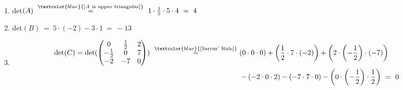 {\color{solution}
\begin{enumerate}
	\item det$(A)~\stackrel{\textcolor{blue}{[A~\text{is upper triangular}]}}{=}~1\cdot\frac{1}{5}\cdot5\cdot4~=~4$
	\item 
	det$(B)~=~5\cdot(-2)-3\cdot1~=~-13$
	\item 
	\begin{align*}
	\text{det}(C)=\text{det}(\begin{pmatrix}
	0&\frac{1}{2}&2\\
	-\frac{1}{2}&0&7\\
	-2&-7&0
	\end{pmatrix})~\stackrel{\textcolor{blue}{[\text{Sarrus' Rule}]}}{=}~&
	(0\cdot 0\cdot 0)
	+\left(\frac{1}{2}\cdot 7\cdot (-2)\right)
	+\left(2\cdot \left(-\frac{1}{2}\right)\cdot (-7)\right)\\
	&
	-(-2\cdot 0\cdot 2)
	-(-7\cdot 7\cdot 0)
	-\left(0\cdot \left(-\frac{1}{2}\right)\cdot \frac{1}{2}\right)~=~0
	\end{align*}
\end{enumerate}
}